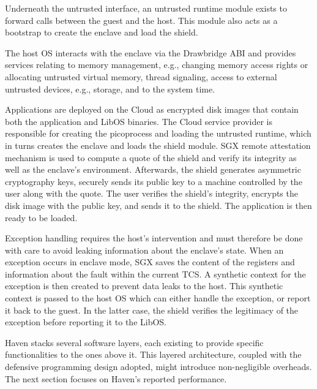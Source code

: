 Underneath the untrusted interface, an untrusted runtime module exists to forward calls between the guest and the host.
This module also acts as a bootstrap to create the enclave and load the shield.

The host OS interacts with the enclave via the Drawbridge ABI and provides services relating to memory management, e.g., changing memory access rights or allocating untrusted virtual memory, thread signaling, access to external untrusted devices, e.g., storage, and to the system time.

Applications are deployed on the Cloud as encrypted disk images that contain both the application and LibOS binaries.
The Cloud service provider is responsible for creating the picoprocess and loading the untrusted runtime, which in turns creates the enclave and loads the shield module.
SGX remote attestation mechanism is used to compute a quote of the shield and verify its integrity as well as the enclave's environment.
Afterwards, the shield generates asymmetric cryptography keys, securely sends its public key to a machine controlled by the user along with the quote.
The user verifies the shield's integrity, encrypts the disk image with the public key, and sends it to the shield.
The application is then ready to be loaded.

Exception handling requires the host's intervention and must therefore be done with care to avoid leaking information about the enclave's state.
When an exception occurs in enclave mode, SGX saves the content of the registers and information about the fault within the current TCS.
A synthetic context for the exception is then created to prevent data leaks to the host.
This synthetic context is passed to the host OS which can either handle the exception, or report it back to the guest.
In the latter case, the shield verifies the legitimacy of the exception before reporting it to the LibOS.

Haven stacks several software layers, each existing to provide specific functionalities to the ones above it.
This layered architecture, coupled with the defensive programming design adopted, might introduce non-negligible overheads.
The next section focuses on Haven's reported performance.

